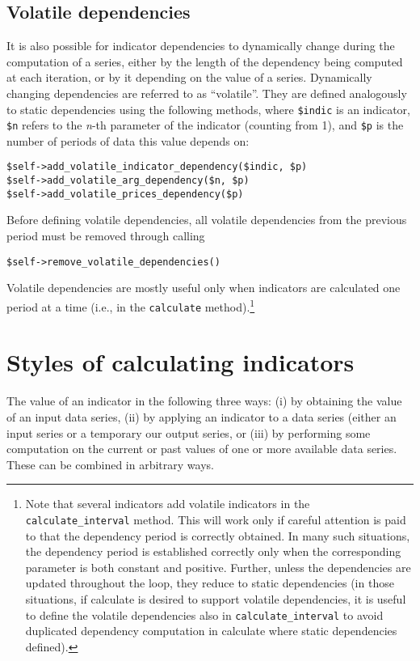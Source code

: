 \documentclass[11pt,twoside]{article}
\begin{document}
\subsection[Volatile dependencies]{\label{bkm:Ref192505424}Volatile
dependencies}
It is also possible for indicator dependencies to dynamically change
during the computation of a series, either by the length of the
dependency being computed at each iteration, or by it depending on the
value of a series. Dynamically changing dependencies are referred to as
``volatile''. They are defined analogously to static dependencies using
the following methods, where \lstinline!$indic! is an
indicator, \lstinline!$n! refers to the \textit{n}-th
parameter of the indicator (counting from 1), and
\lstinline!$p! is the number of periods of data this value
depends on:
\begin{lstlisting}[numbers=none]
$self->add_volatile_indicator_dependency($indic, $p)
$self->add_volatile_arg_dependency($n, $p)
$self->add_volatile_prices_dependency($p)
\end{lstlisting}

Before defining volatile dependencies, all volatile dependencies from
the previous period must be removed through calling
\begin{lstlisting}[numbers=none]
$self->remove_volatile_dependencies()
\end{lstlisting}

Volatile dependencies are mostly useful only when indicators are
calculated one period at a time (i.e., in the
\lstinline!calculate! method).\footnote{Note that several
indicators add volatile indicators in the
\lstinline!calculate_interval! method. This will work only if
careful attention is paid to that the dependency period is correctly
obtained. In many such situations, the dependency period is established
correctly only when the corresponding parameter is both constant and
positive. Further, unless the dependencies are updated throughout the
loop, they reduce to static dependencies (in those situations, if
calculate is desired to support volatile dependencies, it is useful to
define the volatile dependencies also in \lstinline!calculate_interval!
to avoid duplicated dependency computation in calculate where static
dependencies defined).}

\section{Styles of calculating indicators}
The value of an indicator in the following three ways: (i) by obtaining
the value of an input data series, (ii) by applying an indicator to a
data series (either an input series or a temporary our output series,
or (iii) by performing some computation on the current or past values
of one or more available data series. These can be combined in
arbitrary ways.
\end{document}
